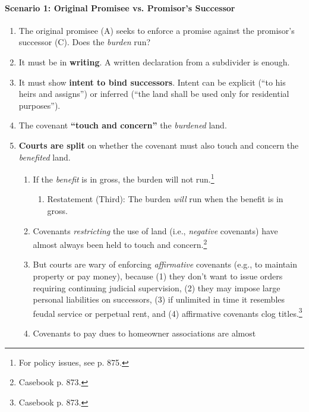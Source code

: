 \paragraph{Scenario 1: Original Promisee vs. Promisor's Successor}

\begin{enumerate}
    \item The original promisee (A) seeks to enforce a promise against the 
    promisor's  successor (C). Does the \emph{burden} run?
    \item It must be in \textbf{writing}. A written declaration from a 
    subdivider is enough.
    \item It must show \textbf{intent to bind successors}. Intent can be 
    explicit (``to his heirs and assigns'') or inferred (``the land shall be 
    used only for residential purposes'').
    \item The covenant \textbf{``touch and concern''} the \emph{burdened} land.
    \item \textbf{Courts are split} on whether the covenant must also touch 
    and concern the \emph{benefited} land.
    \begin{enumerate}
        \item If the \emph{benefit} is in gross, the burden will not 
        run.\footnote{For policy issues, see p. 875.} %
        \begin{enumerate}
            \item Restatement (Third): The burden \emph{will} run when the 
            benefit is in gross.
        \end{enumerate}
        \item Covenants \emph{restricting} the use of land (i.e., 
        \emph{negative} covenants) have almost always been held to touch and 
        concern.\footnote{Casebook p. 873.}
        \item But courts are wary of enforcing \emph{affirmative} covenants 
        (e.g., to maintain property or pay money), because (1) they don't want 
        to issue orders requiring continuing judicial supervision, (2) they 
        may impose large personal liabilities on successors, (3) if unlimited 
        in time it resembles feudal service or perpetual rent, and (4) 
        affirmative covenants clog titles.\footnote{Casebook p. 873.}
        \item Covenants to pay dues to homeowner associations are almost 

\end{enumerate}
\end{enumerate}
